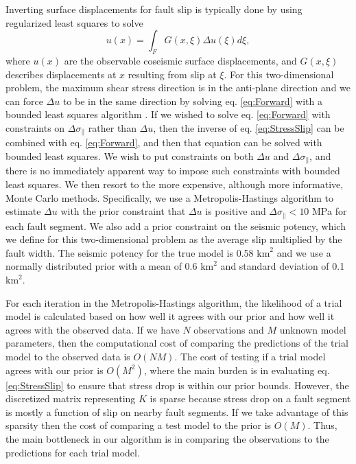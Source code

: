 \documentclass[12pt]{article}
\begin{document}
Inverting surface displacements for fault slip is typically done by using regularized least squares to solve
\begin{equation}\label{eq:Forward}
  u(x) = \int_F G(x,\xi) \Delta u(\xi) d\xi,
\end{equation}
where $u(x)$ are the observable coseismic surface displacements, and $G(x,\xi)$ describes displacements at $x$ resulting from slip at $\xi$.  For this two-dimensional problem, the maximum shear stress direction is in the anti-plane direction and we can force $\Delta u$ to be in the same direction by solving eq. \ref{eq:Forward} with a bounded least squares algorithm \citep{Lawson1995}.  If we wished to solve eq. \ref{eq:Forward} with constraints on $\Delta \sigma_\parallel$ rather than $\Delta u$, then the inverse of eq. \ref{eq:StressSlip} can be combined with eq. \ref{eq:Forward}, and then that equation can be solved with bounded least squares.  We wish to put constraints on both $\Delta u$ and $\Delta \sigma_\parallel$, and there is no immediately apparent way to impose such constraints with bounded least squares.  We then resort to the more expensive, although more informative, Monte Carlo methods.  Specifically, we use a Metropolis-Hastings algorithm to estimate $\Delta u$ with the prior constraint that $\Delta u$ is positive and $\Delta \sigma_\parallel < 10$ MPa for each fault segment.  We also add a prior constraint on the seismic potency, which we define for this two-dimensional problem as the average slip multiplied by the fault width.  The seismic potency for the true model is 0.58 $\mathrm{km}^2$ and we use a normally distributed prior with a mean of 0.6 $\mathrm{km}^2$ and standard deviation of 0.1 $\mathrm{km}^2$.  

For each iteration in the Metropolis-Hastings algorithm, the likelihood of a trial model is calculated based on how well it agrees with our prior and how well it agrees with the observed data.  If we have $N$ observations and $M$ unknown model parameters, then the computational cost of comparing the predictions of the trial model to the observed data is $O(NM)$. The cost of testing if a trial model agrees with our prior is $O(M^2)$, where the main burden is in evaluating eq. \ref{eq:StressSlip} to ensure that stress drop is within our prior bounds.  However, the discretized matrix representing $K$ is sparse because stress drop on a fault segment is mostly a function of slip on nearby fault segments.  If we take advantage of this sparsity then the cost of comparing a test model to the prior is $O(M)$.  Thus, the main bottleneck in our algorithm is in comparing the observations to the predictions for each trial model.  
\end{document}
